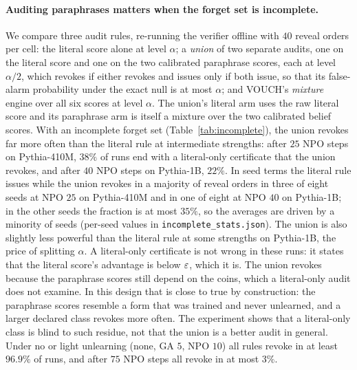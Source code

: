 \paragraph{Auditing paraphrases matters when the forget set is incomplete.} We compare
three audit rules, re-running the verifier offline with $40$ reveal orders per cell: the
literal score alone at level $\alpha$; a \emph{union} of two separate audits, one on the
literal score and one on the two calibrated paraphrase scores, each at level $\alpha/2$,
which revokes if either revokes and issues only if both issue, so that its false-alarm
probability under the exact null is at most $\alpha$; and VOUCH's \emph{mixture} engine
over all six scores at level $\alpha$. The union's literal arm uses the raw literal score
and its paraphrase arm is itself a mixture over the two calibrated belief scores. With an
incomplete forget set
(Table~\ref{tab:incomplete}), the union revokes far more often than the literal rule at
intermediate strengths: after $25$ NPO steps on Pythia-410M, $38\%$ of runs end with a
literal-only certificate that the union revokes, and after $40$ NPO steps on Pythia-1B,
$22\%$. In seed terms the literal rule issues while the union revokes in a majority of
reveal orders in three of eight seeds at NPO $25$ on Pythia-410M and in one of eight at
NPO $40$ on Pythia-1B; in the other seeds the fraction is at most $35\%$, so the averages
are driven by a minority of seeds (per-seed values in \texttt{incomplete\_stats.json}). The
union is also slightly less powerful than the literal rule at some strengths on Pythia-1B,
the price of splitting $\alpha$. A literal-only
certificate is not wrong in these runs: it states that the literal score's advantage is
below $\varepsilon$, which it is. The union revokes because the paraphrase scores still depend on
the coins, which a literal-only audit does not examine. In this design that is close to
true by construction: the paraphrase scores resemble a form that was trained and never
unlearned, and a larger declared class revokes more often. The experiment shows that a
literal-only class is blind to such residue, not that the union is a better audit in
general. Under no or light unlearning (none, GA $5$, NPO $10$) all rules revoke in at least
$96.9\%$ of runs, and after $75$ NPO steps all revoke in at most $3\%$.

\begin{table}[t]
\centering\small
\caption{Literal-only design, Pythia-410M: mean calibrated advantages $\pm$ standard
errors over eight seeds; fraction of runs revoked by the literal and the union rule and
issued by the union rule ($40$ reveal orders per seed); and the membership-inference AUC
of the organic forget biographies against the organic holdout (loss score).}
\label{tab:clean}
\footnotesize\setlength{\tabcolsep}{3pt}
\end{table}


